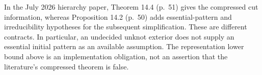In the July 2026 hierarchy paper, Theorem 14.4 (p.~51) gives the
compressed cut information, whereas Proposition 14.2 (p.~50) adds
essential-pattern and irreducibility hypotheses for the subsequent
simplification.  These are different contracts.  In particular,
an undecided unknot exterior does not supply an essential initial
pattern as an available assumption.  The representation lower bound
above is an implementation obligation, not an assertion that the
literature's compressed theorem is false.
